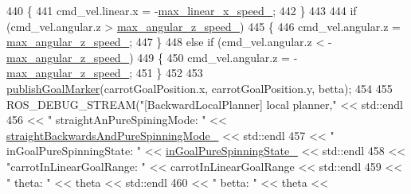 \begin{DoxyCode}
{440                 \{
441                     cmd\_vel.linear.x = -\hyperlink{classcl__move__base__z_1_1backward__local__planner_1_1BackwardLocalPlanner_ae4399072e9ae9cc60d8837860dc4807b}{max\_linear\_x\_speed\_};
442                 \}
443 
444                 \textcolor{keywordflow}{if} (cmd\_vel.angular.z > \hyperlink{classcl__move__base__z_1_1backward__local__planner_1_1BackwardLocalPlanner_af7e492339ee2d1c90c00f6dd4cf95551}{max\_angular\_z\_speed\_})
445                 \{
446                     cmd\_vel.angular.z = \hyperlink{classcl__move__base__z_1_1backward__local__planner_1_1BackwardLocalPlanner_af7e492339ee2d1c90c00f6dd4cf95551}{max\_angular\_z\_speed\_};
447                 \}
448                 \textcolor{keywordflow}{else} \textcolor{keywordflow}{if} (cmd\_vel.angular.z < -\hyperlink{classcl__move__base__z_1_1backward__local__planner_1_1BackwardLocalPlanner_af7e492339ee2d1c90c00f6dd4cf95551}{max\_angular\_z\_speed\_})
449                 \{
450                     cmd\_vel.angular.z = -\hyperlink{classcl__move__base__z_1_1backward__local__planner_1_1BackwardLocalPlanner_af7e492339ee2d1c90c00f6dd4cf95551}{max\_angular\_z\_speed\_};
451                 \}
452 
453                 \hyperlink{classcl__move__base__z_1_1backward__local__planner_1_1BackwardLocalPlanner_a70eaeb6cf31fd3378d9fbf9bcb975995}{publishGoalMarker}(carrotGoalPosition.x, carrotGoalPosition.y, betta);
454 
455                 ROS\_DEBUG\_STREAM(\textcolor{stringliteral}{"[BackwardLocalPlanner] local planner,"} << std::endl
456                                                                          << \textcolor{stringliteral}{" straightAnPureSpiningMode: "} 
      << \hyperlink{classcl__move__base__z_1_1backward__local__planner_1_1BackwardLocalPlanner_a04febb67563add6f715051a94aed1b9b}{straightBackwardsAndPureSpinningMode\_} << std::endl
457                                                                          << \textcolor{stringliteral}{" inGoalPureSpinningState: "} <<
       \hyperlink{classcl__move__base__z_1_1backward__local__planner_1_1BackwardLocalPlanner_ae4d7254afd19ae1f7bd8eac9f5d58b9a}{inGoalPureSpinningState\_} << std::endl
458                                                                          << \textcolor{stringliteral}{"carrotInLinearGoalRange: "} << 
      carrotInLinearGoalRange << std::endl
459                                                                          << \textcolor{stringliteral}{" theta: "} << theta << 
      std::endl
460                                                                          << \textcolor{stringliteral}{" betta: "} << theta << 
}
\end{DoxyCode}
